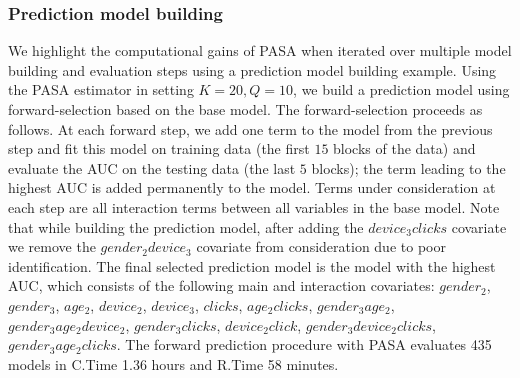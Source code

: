 \documentclass[12pt]{article}
\begin{document}
\subsubsection{Prediction model building} 
We highlight the computational gains of PASA when iterated over multiple model building and evaluation steps using a prediction model building example. Using the PASA estimator in setting $K=20,Q=10$, we build a prediction model using forward-selection based on the base model. The forward-selection proceeds as follows. At each forward step, we add one term to the model from the previous step and fit this model on training data (the first $15$ blocks of the data) and evaluate the AUC on the testing data (the last $5$ blocks); the term leading to the highest AUC is added permanently to the model. Terms under consideration at each step are all interaction terms between all variables in the base model. Note that while building the prediction model, after adding the  $device_3 clicks$ covariate we remove the $gender_2 device_3$ covariate from consideration due to poor identification. The final selected prediction model is the model with the highest AUC, which consists of the following main and interaction covariates: $gender_2$, $gender_3$, $age_2$, $device_2$, $device_3$, $clicks$, $age_2  clicks$, $gender_3  age_2$, $gender_3  age_2  device_2$, $gender_3  clicks$, $device_2  click$, $gender_3  device_2  clicks$, $gender_3  age_2  clicks$. The forward prediction procedure with PASA evaluates 435 models in C.Time 1.36 hours and R.Time 58 minutes.
\end{document}
